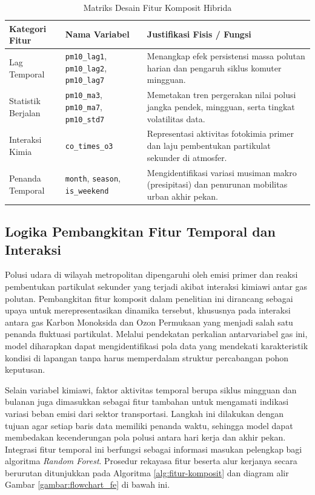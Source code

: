 \begin{table}[htbp]
\centering
\captionsetup{justification=centering}
\setlength{\tabcolsep}{6pt}
\caption{Matriks Desain Fitur Komposit Hibrida}
\label{tbl:matriks_fitur}

\begin{tabularx}{\textwidth}{|>{\raggedright\arraybackslash}p{2.8cm}|
                              >{\raggedright\arraybackslash}p{3.8cm}|
                              >{\raggedright\arraybackslash}X|}
\hline
\textbf{Kategori Fitur} & \textbf{Nama Variabel} & \textbf{Justifikasi Fisis / Fungsi} \\
\hline
Lag Temporal & \texttt{pm10\_lag1}, \texttt{pm10\_lag2}, \texttt{pm10\_lag7} & Menangkap efek persistensi massa polutan harian dan pengaruh siklus komuter mingguan. \\
\hline
Statistik Berjalan & \texttt{pm10\_ma3}, \texttt{pm10\_ma7}, \texttt{pm10\_std7} & Memetakan tren pergerakan nilai polusi jangka pendek, mingguan, serta tingkat volatilitas data. \\
\hline
Interaksi Kimia & \texttt{co\_times\_o3} & Representasi aktivitas fotokimia primer dan laju pembentukan partikulat sekunder di atmosfer. \\
\hline
Penanda Temporal & \texttt{month}, \texttt{season}, \texttt{is\_weekend} & Mengidentifikasi variasi musiman makro (presipitasi) dan penurunan mobilitas urban akhir pekan. \\
\hline
\end{tabularx}
\end{table}

\subsection{Logika Pembangkitan Fitur Temporal dan Interaksi}

Polusi udara di wilayah metropolitan dipengaruhi oleh emisi primer dan reaksi pembentukan partikulat sekunder yang terjadi akibat interaksi kimiawi antar gas polutan. Pembangkitan fitur komposit dalam penelitian ini dirancang sebagai upaya untuk merepresentasikan dinamika tersebut, khususnya pada interaksi antara gas Karbon Monoksida dan Ozon Permukaan yang menjadi salah satu penanda fluktuasi partikulat. Melalui pendekatan perkalian antarvariabel gas ini, model diharapkan dapat mengidentifikasi pola data yang mendekati karakteristik kondisi di lapangan tanpa harus memperdalam struktur percabangan pohon keputusan.

Selain variabel kimiawi, faktor aktivitas temporal berupa siklus mingguan dan bulanan juga dimasukkan sebagai fitur tambahan untuk mengamati indikasi variasi beban emisi dari sektor transportasi. Langkah ini dilakukan dengan tujuan agar setiap baris data memiliki penanda waktu, sehingga model dapat membedakan kecenderungan pola polusi antara hari kerja dan akhir pekan. Integrasi fitur temporal ini berfungsi sebagai informasi masukan pelengkap bagi algoritma \textit{Random Forest}. Prosedur rekayasa fitur beserta alur kerjanya secara berurutan ditunjukkan pada Algoritma \ref{alg:fitur-komposit} dan diagram alir Gambar \ref{gambar:flowchart_fe} di bawah ini.

